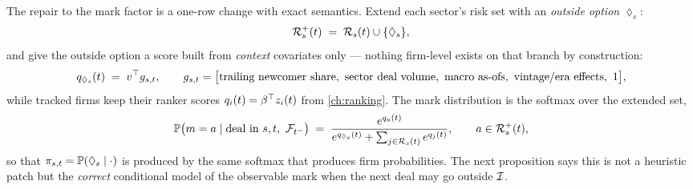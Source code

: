 The repair to the mark factor is a one-row change with exact semantics.
Extend each sector's risk set with an \emph{outside option} $\lozenge_s$:
\begin{equation}\label{eq:ch11:extendedset}
\mathcal{R}^{+}_s(t) \;=\; \mathcal{R}_s(t) \cup \{\lozenge_s\},
\end{equation}
and give the outside option a score built from \emph{context} covariates
only --- nothing firm-level exists on that branch by construction:
\begin{equation}\label{eq:ch11:outsidescore}
q_{\lozenge_s}(t) \;=\; v^{\top} g_{s,t},
\qquad
g_{s,t} = \big[\text{trailing newcomer share},\ \text{sector deal volume},\
\text{macro as-ofs},\ \text{vintage/era effects},\ 1\big],
\end{equation}
while tracked firms keep their ranker scores $q_i(t) =
\beta^{\top}z_i(t)$ from \cref{ch:ranking}. The mark distribution is the
softmax over the extended set,
\begin{equation}\label{eq:ch11:extendedsoftmax}
\mathbb{P}\big(m = a \mid \text{deal in } s,t,\ \mathcal{F}_{t^-}\big)
 \;=\;
 \frac{e^{q_a(t)}}
      {e^{q_{\lozenge_s}(t)} + \sum_{j \in \mathcal{R}_s(t)} e^{q_j(t)}},
\qquad a \in \mathcal{R}^{+}_s(t),
\end{equation}
so that $\pi_{s,t} = \mathbb{P}(\lozenge_s \mid \cdot)$ is produced by the same
softmax that produces firm probabilities. The next proposition says this
is not a heuristic patch but the \emph{correct} conditional model of the
observable mark when the next deal may go outside $\mathcal{I}$.

